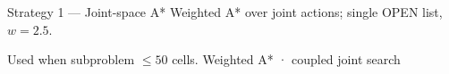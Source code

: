 \begin{frame}{Strategy 1 — Joint-space A*}
    {Weighted A* over joint actions; single OPEN list, $w = 2.5$.}

  \vspace{-0.1cm}
  \begin{center}
    \footnotesize\textcolor{muted}{Used when subproblem $\leq 50$ cells.\quad
      Weighted A* · coupled joint search}
  \end{center}
\end{frame}
